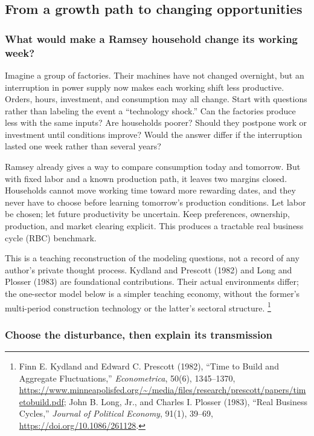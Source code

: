 \subsection{From a growth path to changing opportunities}

\subsubsection{What would make a Ramsey household change its working week?}

Imagine a group of factories. Their machines have not changed overnight, but
an interruption in power supply now makes each working shift less productive.
Orders, hours, investment, and consumption may all change. Start with questions
rather than labeling the event a ``technology shock.'' Can the factories produce
less with the same inputs? Are households poorer? Should they postpone work or
investment until conditions improve? Would the answer differ if the interruption
lasted one week rather than several years?

Ramsey already gives a way to compare consumption today and tomorrow. But with
fixed labor and a known production path, it leaves two margins closed. Households
cannot move working time toward more rewarding dates, and they never have to
choose before learning tomorrow's production conditions. Let labor be chosen;
let future productivity be uncertain. Keep preferences, ownership, production,
and market clearing explicit. This produces a tractable real business cycle
(RBC) benchmark.

This is a teaching reconstruction of the modeling questions, not a record of
any author's private thought process. Kydland and Prescott (1982) and Long and
Plosser (1983) are foundational contributions. Their actual environments differ;
the one-sector model below is a simpler teaching economy, without the former's
multi-period construction technology or the latter's sectoral structure.
\footnote{Finn E. Kydland and Edward C. Prescott (1982), ``Time to Build and
Aggregate Fluctuations,'' \textit{Econometrica}, 50(6), 1345--1370,
\url{https://www.minneapolisfed.org/~/media/files/research/prescott/papers/timetobuild.pdf};
John B. Long, Jr., and Charles I. Plosser (1983), ``Real Business Cycles,''
\textit{Journal of Political Economy}, 91(1), 39--69,
\url{https://doi.org/10.1086/261128}.}

\subsubsection{Choose the disturbance, then explain its transmission}

